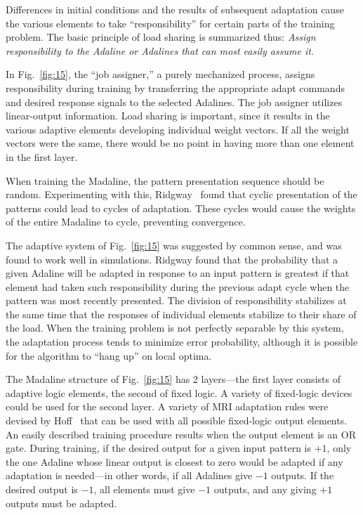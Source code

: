 \documentclass[10pt,twocolumn]{article}
\begin{document}
Differences in initial conditions and the results of subsequent adaptation cause
the various elements to take ``responsibility'' for certain parts of the training
problem. The basic principle of load sharing is summarized thus: \textit{Assign
responsibility to the Adaline or Adalines that can most easily assume it.}

In Fig.~\ref{fig:15}, the ``job assigner,'' a purely mechanized process, assigns
responsibility during training by transferring the appropriate adapt commands and
desired response signals to the selected Adalines. The job assigner utilizes
linear-output information. Load sharing is important, since it results in the
various adaptive elements developing individual weight vectors. If all the weight
vectors were the same, there would be no point in having more than one element in
the first layer.

When training the Madaline, the pattern presentation sequence should be random.
Experimenting with this, Ridgway~\cite{ridgway} found that cyclic presentation of
the patterns could lead to cycles of adaptation. These cycles would cause the
weights of the entire Madaline to cycle, preventing convergence.

The adaptive system of Fig.~\ref{fig:15} was suggested by common sense, and was
found to work well in simulations. Ridgway found that the probability that a given
Adaline will be adapted in response to an input pattern is greatest if that element
had taken such responsibility during the previous adapt cycle when the pattern was
most recently presented. The division of responsibility stabilizes at the same time
that the responses of individual elements stabilize to their share of the load.
When the training problem is not perfectly separable by this system, the adaptation
process tends to minimize error probability, although it is possible for the
algorithm to ``hang up'' on local optima.

The Madaline structure of Fig.~\ref{fig:15} has 2 layers---the first layer consists
of adaptive logic elements, the second of fixed logic. A variety of fixed-logic
devices could be used for the second layer. A variety of MRI adaptation rules were
devised by Hoff~\cite{hoff} that can be used with all possible fixed-logic output
elements. An easily described training procedure results when the output element is
an OR gate. During training, if the desired output for a given input pattern is
$+1$, only the one Adaline whose linear output is closest to zero would be adapted
if any adaptation is needed---in other words, if all Adalines give $-1$ outputs. If
the desired output is $-1$, all elements must give $-1$ outputs, and any giving $+1$
outputs must be adapted.
\end{document}
